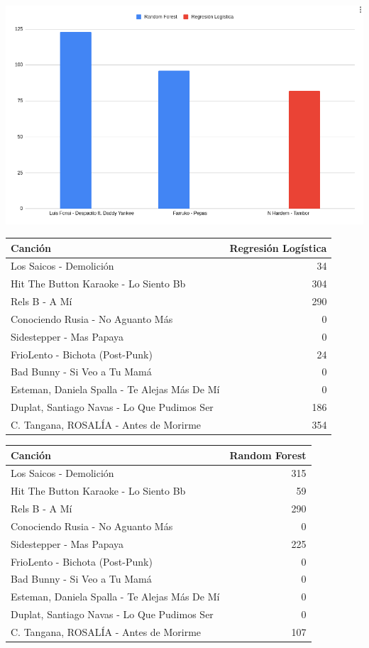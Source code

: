 \documentclass[11pt]{article}
\begin{document}
\begin{center}
\includegraphics[width=.9\linewidth]{images/hist1.png}
\end{center}

\begin{center}
\begin{tabular}{lr}
Canción & Regresión Logística\\
\hline
Los Saicos - Demolición & 34\\
Hit The Button Karaoke - Lo Siento Bb & 304\\
Rels B - A Mí & 290\\
Conociendo Rusia - No Aguanto Más & 0\\
Sidestepper - Mas Papaya & 0\\
FrioLento - Bichota (Post-Punk) & 24\\
Bad Bunny - Si Veo a Tu Mamá & 0\\
Esteman, Daniela Spalla - Te Alejas Más De Mí & 0\\
Duplat, Santiago Navas - Lo Que Pudimos Ser & 186\\
C. Tangana, ROSALÍA - Antes de Morirme & 354\\
\end{tabular}
\end{center}

\begin{center}
\begin{tabular}{lr}
Canción & Random Forest\\
\hline
Los Saicos - Demolición & 315\\
Hit The Button Karaoke - Lo Siento Bb & 59\\
Rels B - A Mí & 290\\
Conociendo Rusia - No Aguanto Más & 0\\
Sidestepper - Mas Papaya & 225\\
FrioLento - Bichota (Post-Punk) & 0\\
Bad Bunny - Si Veo a Tu Mamá & 0\\
Esteman, Daniela Spalla - Te Alejas Más De Mí & 0\\
Duplat, Santiago Navas - Lo Que Pudimos Ser & 0\\
C. Tangana, ROSALÍA - Antes de Morirme & 107\\
\end{tabular}
\end{center}
\end{document}
